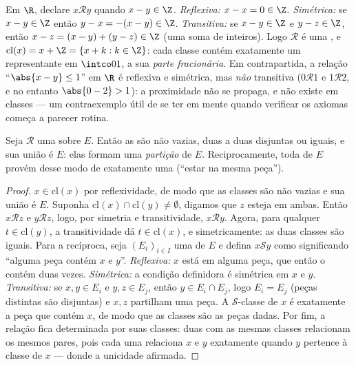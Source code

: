 \begin{example}\label{ex:b1:logic:fracpart}
Em $\R$, declare $x \mathbin{\mathcal{R}} y$ quando $x - y \in \Z$.
\emph{Reflexiva:} $x - x = 0 \in \Z$. \emph{Simétrica:} se $x - y
\in \Z$ então $y - x = -(x - y) \in \Z$. \emph{Transitiva:} se $x -
y \in \Z$ e $y - z \in \Z$, então $x - z = (x - y) + (y - z) \in
\Z$ (uma soma de inteiros). Logo $\mathcal R$ é uma , e $\mathrm{cl}(x) = x + \Z = \{x + k : k \in \Z\}$:
cada classe contém exatamente um representante em $\intco01$, a sua
\emph{parte fracionária}. Em contrapartida, a relação ``$\abs{x - y}
\leq 1$'' em $\R$ é reflexiva e simétrica, mas \emph{não}
transitiva ($0 \mathbin{\mathcal R} 1$ e $1 \mathbin{\mathcal R}
2$, e no entanto $\abs{0 - 2} > 1$): a proximidade não se propaga, e não
existe  em classes --- um contraexemplo útil de se ter em mente
quando verificar os axiomas começa a parecer rotina.
\end{example}

\begin{theorem}\label{thm:b1:logic:partition}
Seja $\mathcal{R}$ uma  sobre $E$. Então as
 são não vazias, duas a duas disjuntas ou iguais,
e sua união é $E$: elas formam uma \emph{partição} de $E$.
Reciprocamente, toda  de $E$ provém desse modo de exatamente uma
 (``estar na mesma peça'').
\end{theorem}

\begin{proof}
$x \in \mathrm{cl}(x)$ por reflexividade, de modo que as classes são não vazias e sua
união é $E$. Suponha $\mathrm{cl}(x) \cap \mathrm{cl}(y) \neq \emptyset$,
digamos que $z$ esteja em ambas. Então $x \mathbin{\mathcal{R}} z$ e $y
\mathbin{\mathcal{R}} z$, logo, por simetria e transitividade, $x
\mathbin{\mathcal{R}} y$. Agora, para qualquer $t \in \mathrm{cl}(y)$,
a transitividade dá $t \in \mathrm{cl}(x)$, e simetricamente: as duas
classes são iguais. Para a recíproca, seja $(E_i)_{i \in I}$ uma
 de $E$ e defina $x \mathbin{\mathcal S} y$ como significando
``alguma peça contém $x$ e $y$''. \emph{Reflexiva:} $x$
está em alguma peça, que então o contém duas vezes.
\emph{Simétrica:} a condição definidora é simétrica em $x$ e
$y$. \emph{Transitiva:} se $x, y \in E_i$ e $y, z \in E_j$, então
$y \in E_i \cap E_j$, logo $E_i = E_j$ (peças distintas são
disjuntas) e $x, z$ partilham uma peça. A $\mathcal S$-classe de $x$
é exatamente a peça que contém $x$, de modo que as classes são as peças
dadas. Por fim, a relação fica determinada por suas classes: duas
 com as mesmas classes relacionam os mesmos pares,
pois cada uma relaciona $x$ e $y$ exatamente quando $y$ pertence à
classe de $x$ --- donde a unicidade afirmada.
\end{proof}

